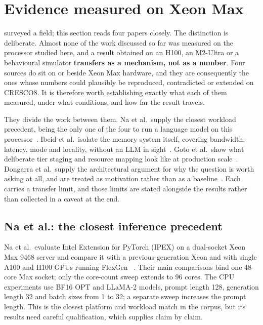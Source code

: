 
\section{Evidence measured on Xeon Max}
\label{sec:related-work}

 surveyed a field; this section reads four
papers closely.  The distinction is deliberate.  Almost none of the work
discussed so far was measured on the processor studied here, and a
result obtained on an H100, an M2-Ultra or a behavioural simulator
\textbf{transfers as a mechanism, not as a number}.  Four sources do sit on or beside Xeon
Max hardware, and they are consequently the ones whose numbers could
plausibly be reproduced, contradicted or extended on CRESCO8.  It is
therefore worth establishing exactly what each of them measured, under
what conditions, and how far the result travels.

They divide the work between them.  Na et al.\ supply the closest
workload precedent, being the only one of the four to run a language
model on this processor~\cite{na2024llmcpu}.  Ibeid et al.\ isolate the
memory system itself, covering bandwidth, latency, mode and locality,
without an LLM in sight~\cite{ibeid2025aurora}.  Goto et al.\ show what
deliberate tier staging and resource mapping look like at production
scale~\cite{goto2026aurorahpl}.  Dongarra et al.\ supply the
architectural argument for why the question is worth asking at all, and
are treated as motivation rather than as a
baseline~\cite{dongarra2026gpus}.  Each carries a transfer limit, and
those limits are stated alongside the results rather than collected in a
caveat at the end.

\subsection{Na et al.: the closest inference precedent}
\label{sec:na-review}

Na et al.\ evaluate Intel Extension for PyTorch (IPEX) on a dual-socket
Xeon Max 9468 server and compare it with a previous-generation Xeon and
with single A100 and H100 GPUs running FlexGen
~\cite{na2024llmcpu}.  Their main comparisons bind one 48-core Max
socket; only the core-count sweep extends to 96 cores.  The CPU
experiments use BF16 OPT and LLaMA-2 models, prompt length 128,
generation length 32 and batch sizes from 1 to 32; a separate sweep
increases the prompt length.  This is the closest platform and workload
match in the corpus, but its results need careful qualification, which
 supplies claim by claim.

